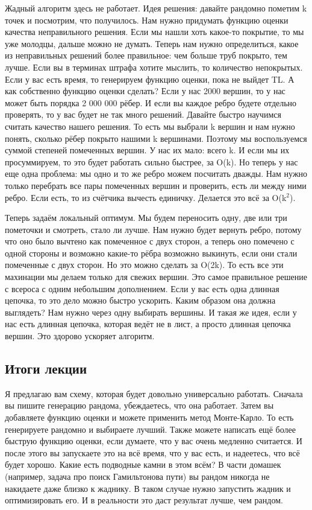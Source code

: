 \documentclass[12pt]{article}
\begin{document}
Жадный алгоритм здесь не работает. Идея решения: давайте рандомно пометим k точек и посмотрим, что получилось. Нам нужно придумать функцию оценки качества неправильного решения. Если мы нашли хоть какое-то покрытие, то мы уже молодцы, дальше можно не думать. Теперь нам нужно определиться, какое из неправильных решений более правильное: чем больше труб покрыто, тем лучше. Если вы в терминах штрафа хотите мыслить, то количество непокрытых. Если у вас есть время, то генерируем функцию оценки, пока не выйдет TL. А как собственно функцию оценки сделать? Если у нас 2000 вершин, то у нас может быть порядка 2 000 000 рёбер. И если вы каждое ребро будете отдельно проверять, то у вас будет не так много решений. Давайте быстро научимся считать качество нашего решения. То есть мы выбрали k вершин и нам нужно понять, сколько рёбер покрыто нашими k вершинами. Поэтому мы воспользуемся суммой степеней помеченных вершин. У нас их мало: всего k. И если мы их просуммируем, то это будет работать сильно быстрее, за O(k). Но теперь у нас еще одна проблема: мы одно и то же ребро можем посчитать дважды. Нам нужно только перебрать все пары помеченных вершин и проверить, есть ли между ними ребро. Если есть, то из счётчика вычесть единичку. Делается это всё за O(k$^2$).

Теперь задаём локальный оптимум. Мы будем переносить одну, две или три пометочки и смотреть, стало ли лучше. Нам нужно будет вернуть ребро, потому что оно было вычтено как помеченное с двух сторон, а теперь оно помечено с одной стороны и возможно какие-то рёбра возможно выкинуть, если они стали помеченные с двух сторон. Но это можно сделать за O(2k). То есть все эти махинации мы делаем только для свежих вершин. Это самое правильное решение с всероса с одним небольшим дополнением. Если у вас есть одна длинная цепочка, то это дело можно быстро ускорить. Каким образом она должна выглядеть? Нам нужно через одну выбирать вершины. И такая же идея, если у нас есть длинная цепочка, которая ведёт не в лист, а просто длинная цепочка вершин. Это здорово ускоряет алгоритм.

\subsection*{Итоги лекции}
Я предлагаю вам схему, которая будет довольно универсально работать. Сначала вы пишите генерацию рандома, убеждаетесь, что она работает. Затем вы добавляете функцию оценки и можете применить метод Монте-Карло. То есть генерируете рандомно и выбираете лучший. Также можете написать ещё более быструю функцию оценки, если думаете, что у вас очень медленно считается. И после этого вы запускаете это на всё время, что у вас есть, и надеетесь, что всё будет хорошо. Какие есть подводные камни в этом всём? В части домашек (например, задача про поиск Гамильтонова пути) вы рандом никогда не накидаете даже близко к жаднику. В таком случае нужно запустить жадник и оптимизировать его. И в реальности это даст результат лучше, чем рандом.
\end{document}

